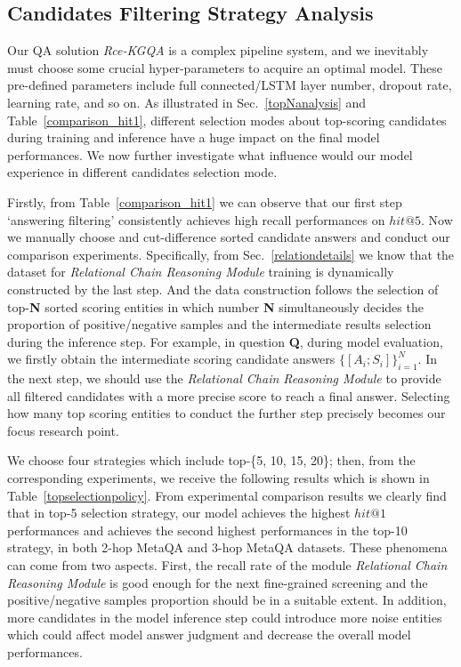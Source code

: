 \documentclass[pdflatex,sn-mathphys]{sn-jnl}%
\theoremstyle{thmstyleone}%
\theoremstyle{thmstyletwo}%
\theoremstyle{thmstylethree}%
\begin{document}
\subsection{Candidates Filtering Strategy Analysis}
Our QA solution \textit{Rce-KGQA} is a complex pipeline system, and we inevitably must choose some crucial hyper-parameters to acquire an optimal model. These pre-defined parameters include full connected/LSTM layer number, dropout rate, learning rate, and so on. As illustrated in Sec.~\ref{topNanalysis} and Table~\ref{comparison_hit1}, different selection modes about top-scoring candidates during training and inference have a huge impact on the final model performances. We now further investigate what influence would our model experience in different candidates selection mode.

Firstly, from Table~\ref{comparison_hit1} we can observe that our first step `answering filtering' consistently achieves high recall performances on $hit@5$. Now we manually choose and cut-difference sorted candidate answers and conduct our comparison experiments. Specifically, from Sec.~\ref{relationdetails} we know that the dataset for \textit{Relational Chain Reasoning Module} training is dynamically constructed by the last step. And the data construction follows the selection of top-\textbf{N} sorted scoring entities in which number \textbf{N} simultaneously decides the proportion of positive/negative samples and the intermediate results selection during the inference step. For example, in question \textbf{Q}, during model evaluation, we firstly obtain the intermediate scoring candidate answers $\{[A_{i};S_{i}]\}_{i=1}^{N}$. In the next step, we should use the \textit{Relational Chain Reasoning Module} to provide all filtered candidates with a more precise score to reach a final answer. Selecting how many top scoring entities to conduct the further step precisely becomes our focus research point.

We choose four strategies which include top-\{5, 10, 15, 20\}; then, from the corresponding experiments, we receive the following results which is shown in Table~\ref{topselectionpolicy}. From experimental comparison results we clearly find that in top-5 selection strategy, our model achieves the highest $hit@1$ performances and achieves the second highest performances in the top-10 strategy, in both 2-hop MetaQA and 3-hop MetaQA datasets. These phenomena can come from two aspects. First, the recall rate of the module \textit{Relational Chain Reasoning Module} is good enough for the next fine-grained screening and the positive/negative samples proportion should be in a suitable extent. In addition, more candidates in the model inference step could introduce more noise entities which could affect model answer judgment and decrease the overall model performances.
\end{document}
